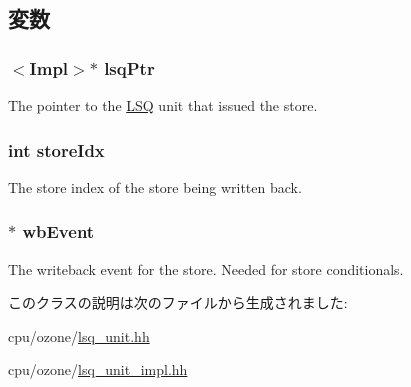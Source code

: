 \subsection{変数}
\hypertarget{classOzoneLSQ_1_1StoreCompletionEvent_aa33578af3999e3e09c82021edd469a25}{
\subsubsection[{lsqPtr}]{$<$Impl$>$$\ast$ {\bf lsqPtr}}}
\label{classOzoneLSQ_1_1StoreCompletionEvent_aa33578af3999e3e09c82021edd469a25}
The pointer to the \hyperlink{classLSQ}{LSQ} unit that issued the store. \hypertarget{classOzoneLSQ_1_1StoreCompletionEvent_a57382c4b905ebe92d67d0675cf257dad}{
\subsubsection[{storeIdx}]{\setlength{\rightskip}{0pt plus 5cm}int {\bf storeIdx}}}
\label{classOzoneLSQ_1_1StoreCompletionEvent_a57382c4b905ebe92d67d0675cf257dad}
The store index of the store being written back. \hypertarget{classOzoneLSQ_1_1StoreCompletionEvent_a3adecc4b1215c9d4f4d6b9f9f62d7c1c}{
\subsubsection[{wbEvent}]{$\ast$ {\bf wbEvent}}}
\label{classOzoneLSQ_1_1StoreCompletionEvent_a3adecc4b1215c9d4f4d6b9f9f62d7c1c}
The writeback event for the store. Needed for store conditionals. 

このクラスの説明は次のファイルから生成されました:\begin{DoxyCompactItemize}
\item 
cpu/ozone/\hyperlink{ozone_2lsq__unit_8hh}{lsq\_\-unit.hh}\item 
cpu/ozone/\hyperlink{ozone_2lsq__unit__impl_8hh}{lsq\_\-unit\_\-impl.hh}\end{DoxyCompactItemize}
